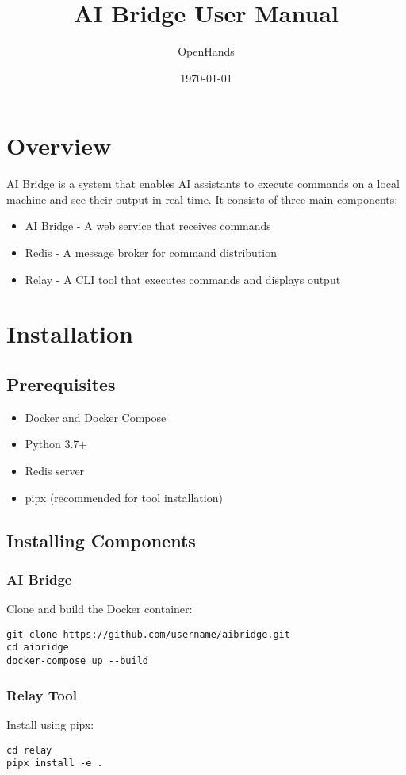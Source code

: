 \documentclass{article}
\title{AI Bridge User Manual}
\author{OpenHands}
\date{\today}
\begin{document}
\maketitle

\section{Overview}
AI Bridge is a system that enables AI assistants to execute commands on a local machine and see their output in real-time. It consists of three main components:
\begin{itemize}
    \item AI Bridge - A web service that receives commands
    \item Redis - A message broker for command distribution
    \item Relay - A CLI tool that executes commands and displays output
\end{itemize}

\section{Installation}

\subsection{Prerequisites}
\begin{itemize}
    \item Docker and Docker Compose
    \item Python 3.7+
    \item Redis server
    \item pipx (recommended for tool installation)
\end{itemize}

\subsection{Installing Components}

\subsubsection{AI Bridge}
Clone and build the Docker container:
\begin{verbatim}
git clone https://github.com/username/aibridge.git
cd aibridge
docker-compose up --build
\end{verbatim}

\subsubsection{Relay Tool}
Install using pipx:
\begin{verbatim}
cd relay
pipx install -e .
\end{verbatim}
\end{document}
